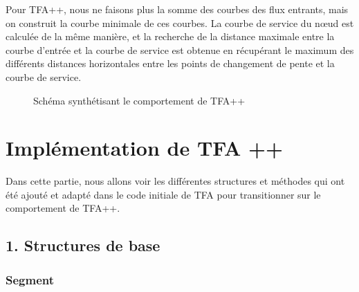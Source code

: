 \documentclass[12pt]{report}
\begin{document}
\break{}

Pour TFA++, nous ne faisons plus la somme des courbes des flux entrants,
mais on construit la courbe minimale de ces courbes. La courbe de 
service du nœud est calculée de la même manière, et la recherche
de la distance maximale entre la courbe d'entrée et la courbe de
service est obtenue en récupérant le maximum des différents 
distances horizontales entre les points de changement de pente
et la courbe de service.

\bigskip

\vspace{0.5cm}
\begin{figure}[h!]
\begin{center}
\end{center}
\caption{Schéma synthétisant le comportement de TFA++}
\end{figure}

\break{}

\section{Implémentation de TFA ++}

Dans cette partie, nous allons voir les différentes structures
et méthodes qui ont été ajouté et adapté dans le code initiale
de TFA pour transitionner sur le comportement de TFA++.

\subsection*{1. Structures de base}

\subsubsection*{Segment}
\end{document}
